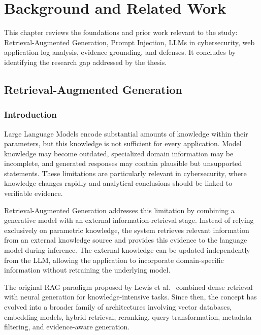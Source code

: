 \chapter{Background and Related Work}\label{background-and-related-work}

This chapter reviews the foundations and prior work relevant to the
study: Retrieval-Augmented Generation, Prompt Injection, LLMs in
cybersecurity, web application log analysis, evidence grounding, and
defenses. It concludes by identifying the research gap addressed by the
thesis.

\section{Retrieval-Augmented
Generation}\label{retrieval-augmented-generation}

\subsection{Introduction}\label{background-introduction}

Large Language Models encode substantial amounts of knowledge within
their parameters, but this knowledge is not sufficient for every
application. Model knowledge may become outdated, specialized domain
information may be incomplete, and generated responses may contain
plausible but unsupported statements. These limitations are particularly
relevant in cybersecurity, where knowledge changes rapidly and
analytical conclusions should be linked to verifiable evidence.

Retrieval-Augmented Generation addresses this limitation by combining a
generative model with an external information-retrieval stage. Instead
of relying exclusively on parametric knowledge, the system retrieves
relevant information from an external knowledge source and provides this
evidence to the language model during inference. The external knowledge
can be updated independently from the LLM, allowing the application to
incorporate domain-specific information without retraining the
underlying model.

The original RAG paradigm proposed by Lewis et al.~\cite{lewis2020rag}
combined dense retrieval with neural generation for knowledge-intensive
tasks. Since
then, the concept has evolved into a broader family of architectures
involving vector databases, embedding models, hybrid retrieval,
reranking, query transformation, metadata filtering, and evidence-aware
generation.


